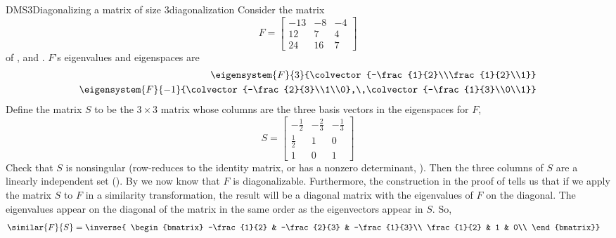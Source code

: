 \begin{example}{DMS3}{Diagonalizing a matrix of size 3}{diagonalization}
Consider the matrix
%
\begin{equation*}
F=
\begin{bmatrix}
-13 & -8 & -4\\
12 & 7 & 4\\
24 & 16 & 7
\end{bmatrix}
\end{equation*}
%
of ,  and .  $F$'s eigenvalues and eigenspaces are
%
\begin{align*}
\eigensystem{F}{3}{\colvector{-\frac{1}{2}\\\frac{1}{2}\\1}}\\
\eigensystem{F}{-1}{\colvector{-\frac{2}{3}\\1\\0},\,\colvector{-\frac{1}{3}\\0\\1}}
\end{align*}
%
Define the matrix $S$ to be the $3\times 3$ matrix whose columns are the three basis vectors in the eigenspaces for $F$,
%
\begin{equation*}
S=
\begin{bmatrix}
-\frac{1}{2} & -\frac{2}{3} & -\frac{1}{3}\\
\frac{1}{2} & 1 & 0\\
1 & 0 & 1
\end{bmatrix}
\end{equation*}
%
Check that $S$ is nonsingular (row-reduces to the identity matrix,  or has a nonzero determinant, ).  Then the three columns of $S$ are a linearly independent set ().  By  we now know that $F$ is diagonalizable.  Furthermore, the construction in the proof of  tells us that if we apply the matrix $S$ to $F$ in a similarity transformation, the result will be a diagonal matrix with the eigenvalues of $F$ on the diagonal.  The eigenvalues appear on the diagonal of the matrix in the same order as the eigenvectors appear in $S$.  So,
%
\begin{align*}
\similar{F}{S}&=
\inverse{
\begin{bmatrix}
-\frac{1}{2} & -\frac{2}{3} & -\frac{1}{3}\\
\frac{1}{2} & 1 & 0\\

\end{bmatrix}}
\end{align*}
\end{example}
